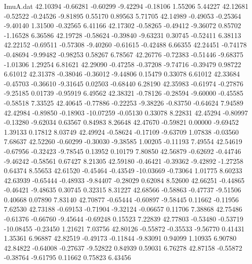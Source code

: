 \begin{filecontents}{ImuA.dat}
  42.10394   -0.66281   -0.60299   -9.42294   -0.18106    1.55206    5.44227
  42.12681   -0.52522   -0.24526   -9.81895    0.55170    0.89563    5.71705
  42.14989   -0.49053   -0.25364   -9.40140    1.31500   -0.32565    6.41166
  42.17302   -0.58265   -0.49412   -9.36072    0.85702   -1.16528    6.36586
  42.19728   -0.58624   -0.39840   -9.63231    0.30745   -0.52411    6.38113
  42.22152   -0.69511   -0.57308   -9.40260   -0.61615   -0.42488    6.66355
  42.24451   -0.74178   -0.48694   -9.99482   -0.98253    0.58267    6.78567
  42.26776   -0.72383   -0.51446   -9.68375   -1.01306    1.29254    6.81621
  42.29090   -0.47258   -0.37208   -9.74716   -0.39479    0.98722    6.61012
  42.31378   -0.38046   -0.36012   -9.44806    0.15479    0.33078    6.61012
  42.33684   -0.45703   -0.36610   -9.31645    0.02503   -0.68440    6.28190
  42.35983   -0.61974   -0.27876   -9.25185    0.01739   -0.95919    6.49562
  42.38321   -0.78126   -0.28594   -9.60000   -0.45585   -0.58518    7.33525
  42.40645   -0.77886   -0.22253   -9.38226   -0.83750   -0.64624    7.94589
  42.42984   -0.89850   -0.18903  -10.07259   -0.05130    0.33078    8.22831
  42.45294   -0.80997   -0.13280   -9.62034    0.63567    0.84983    8.26648
  42.47670   -0.59821    0.00000   -9.69452    1.39133    0.17812    8.03749
  42.49924   -0.58624   -0.17109   -9.63709    1.07838   -0.03560    7.68637
  42.52260   -0.60299   -0.30030   -9.38585    1.00205   -0.11193    7.49554
  42.54619   -0.67956   -0.32423   -9.78545    0.13952    0.10179    7.80850
  42.56879   -0.62692   -0.44746   -9.46242   -0.58561    0.67427    8.21305
  42.59180   -0.46421   -0.39362   -9.42892   -1.27258    0.64374    8.55653
  42.61520   -0.45464   -0.43549  -10.03669   -0.73064    1.01775    8.60233
  42.63939   -0.65444   -0.48933   -9.84407   -0.28029    0.62084    8.52600
  42.66251   -0.44865   -0.46421   -9.48635    0.30745    0.32315    8.31227
  42.68566   -0.58863   -0.47737   -9.51506    0.40668    0.07890    7.83140
  42.70877   -0.65444   -0.60897   -9.58445    0.11662   -0.11956    7.62530
  42.73188   -0.69153   -0.71904   -9.32124   -0.06657    0.11706    7.38868
  42.75486   -0.61376   -0.66760   -9.45644   -0.69248    0.15523    7.22839
  42.77803   -0.53480   -0.53719  -10.08455   -0.23450    1.21621    7.03756
  42.80126   -0.55872   -0.35533   -9.56770    0.41431    1.35361    6.96887
  42.82519   -0.49173   -0.11844   -9.83091    0.94099    1.10935    6.90780
  42.84822   -0.64008   -0.27637   -9.52822    0.84939    0.59031    6.76278
  42.87158   -0.55872   -0.38764   -9.61795    0.11662    0.75823    6.43456

\end{filecontents}
